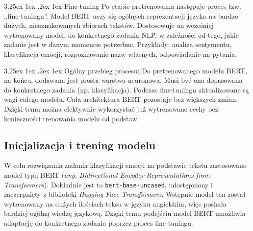 \documentclass[wmii, inf, mgr]{uwmthesis}
\makeatletter
\renewcommand\paragraph{\@startsection{paragraph}{4}{\z@}%
  {3.25ex \@plus1ex \@minus.2ex}%
  {1ex}%
  {\normalfont\normalsize\bfseries}}
\makeatother
\begin{document}
\paragraph{Fine-tuning}
Po etapie pretrenowania następuje proces tzw. ,,fine-tuningu''. Model BERT uczy się ogólnych reprezentacji języka na bardzo dużych, nieoznakowanych zbiorach tekstów. Dostosowuje on wcześniej wytrenowany model, do konkretnego zadania NLP, w zależności od tego, jakie zadanie jest w danym momencie potrzebne. Przykłady: analiza sentymentu, klasyfikacja emocji, rozpoznawanie nazw własnych, odpowiadanie na pytania.

\paragraph{Ogólny przebieg procesu:}
Do pretrenowanego modelu BERT, na końcu, dodawana jest prosta warstwa neuronowa. Musi być ona dopasowana do konkretnego zadania (np. klasyfikacja). Podczas fine-tuningu aktualizowane są wagi całego modelu. Cała architektura BERT pozostaje bez większych zmian. Dzięki temu można efektywnie wykorzystać już wytrenowane cechy bez konieczności trenowania modelu od podstaw.


\subsection{Inicjalizacja i trening modelu}
W celu rozwiązania zadania klasyfikacji emocji na podstawie tekstu zastosowano model typu BERT (\textit{ang. Bidirectional Encoder Representations from Transformers}). Dokładnie jest to \texttt{bert-base-uncased}, udostępniony i zaczerpnięty z  biblioteki \textit{Hugging Face Transformers}. Wstępnie model ten został  wytrenowany na dużych ilościach teksu w języku angielskim, więc posiada bardziej ogólną wiedzę językową. Dzięki temu podejściu model BERT umożliwia adaptację do konkretnego zadania poprzez proces fine-tuningu.
\end{document}
